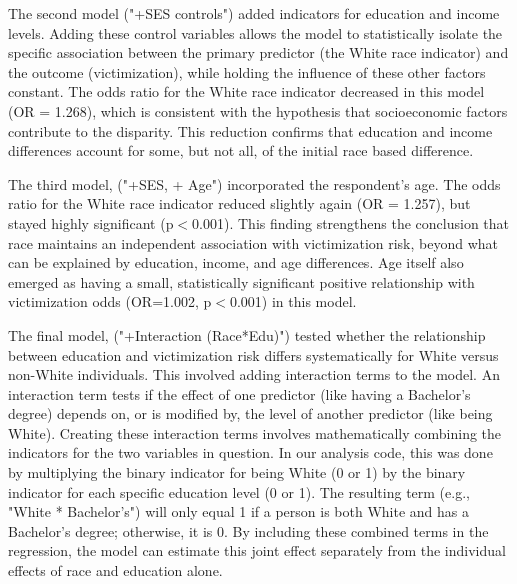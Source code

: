 The second model ("+SES controls") added indicators for education and income levels. Adding these control variables allows the model to statistically isolate the specific association between the primary predictor (the White race indicator) and the outcome (victimization), while holding the influence of these other factors constant. The odds ratio for the White race indicator decreased in this model (OR = 1.268), which is consistent with the hypothesis that socioeconomic factors contribute to the disparity. This reduction confirms that education and income differences account for some, but not all, of the initial race based difference.

The third model, ("+SES, + Age") incorporated the respondent's age. The odds ratio for the White race indicator reduced slightly again (OR = 1.257), but stayed highly significant (p$<$0.001). This finding strengthens the conclusion that race maintains an independent association with victimization risk, beyond what can be explained by education, income, and age differences. Age itself also emerged as having a small, statistically significant positive relationship with victimization odds (OR=1.002, p$<$0.001) in this model. 

The final model, ("+Interaction (Race*Edu)") tested whether the relationship between education and victimization risk differs systematically for White versus non-White individuals. This involved adding interaction terms to the model. An interaction term tests if the effect of one predictor (like having a Bachelor's degree) depends on, or is modified by, the level of another predictor (like being White). Creating these interaction terms involves mathematically combining the indicators for the two variables in question. In our analysis code, this was done by multiplying the binary indicator for being White (0 or 1) by the binary indicator for each specific education level (0 or 1). The resulting term (e.g., "White * Bachelor's") will only equal 1 if a person is both White and has a Bachelor's degree; otherwise, it is 0. By including these combined terms in the regression, the model can estimate this joint effect separately from the individual effects of race and education alone.

